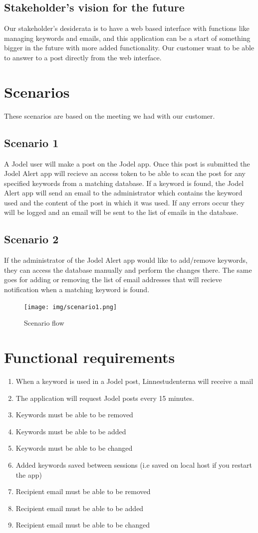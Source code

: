 \documentclass[a4paper,12pt]{article}
\begin{document}
\subsection{Stakeholder's vision for the future}
Our stakeholder's desiderata is to have a web based interface with functions like managing keywords and emails, and this application can be a start of something bigger in the future with more added functionality.
Our customer want to be able to answer to a post directly from the web interface.
\section{Scenarios}
These scenarios are based on the meeting we had with our customer.
\subsection{Scenario 1}
A Jodel user will make a post on the Jodel app. Once this post is submitted the Jodel Alert app will recieve an access token to be able to scan the post for any specified keywords from a matching database. If a keyword is found, the Jodel Alert app will send an email to the administrator which contains the keyword used and the content of the post in which it was used. If any errors occur they will be logged and an email will be sent to the list of emails in the database.
\subsection{Scenario 2}
If the administrator of the Jodel Alert app would like to add/remove keywords, they can access the database manually and perform the changes there. The same goes for adding or removing the list of email addresses that will recieve notification when a matching keyword is found.
\begin{figure}[!h]
	\centering
	\texttt{[image: img/scenario1.png]}
	\caption{Scenario flow}
\end{figure}
\section{Functional requirements}
\begin{enumerate}
	\item When a keyword is used in a Jodel post, Linnestudenterna will receive a mail
	\item The application will request Jodel posts every 15 minutes.
	\item Keywords must be able to be removed
	\item Keywords must be able to be added
	\item Keywords must be able to be changed
	\item Added keywords saved between sessions (i.e saved on local host if you restart the app)
	\item Recipient email must be able to be removed
	\item Recipient email must be able to be added
	\item Recipient email must be able to be changed
\end{enumerate}
\end{document}
